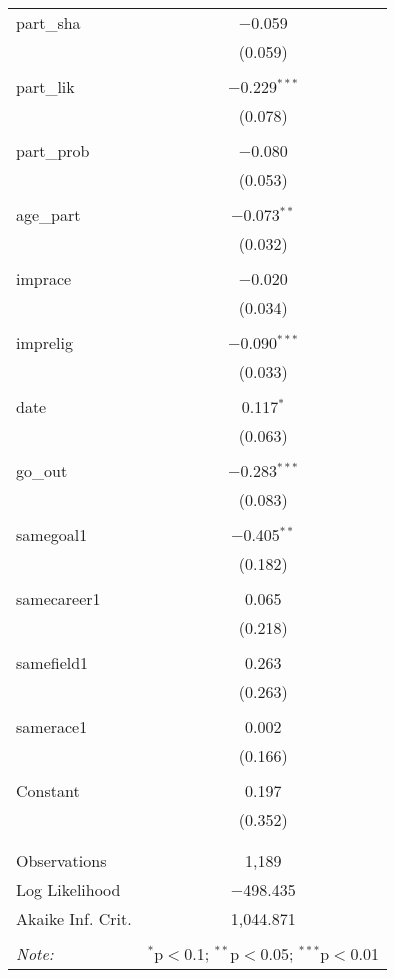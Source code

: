 \begin{table}[!htbp]
\begin{tabular}{@{\extracolsep{5pt}}lc}
 part\_sha & $-$0.059 \\ 
  & (0.059) \\ 
  & \\ 
 part\_lik & $-$0.229$^{***}$ \\ 
  & (0.078) \\ 
  & \\ 
 part\_prob & $-$0.080 \\ 
  & (0.053) \\ 
  & \\ 
 age\_part & $-$0.073$^{**}$ \\ 
  & (0.032) \\ 
  & \\ 
 imprace & $-$0.020 \\ 
  & (0.034) \\ 
  & \\ 
 imprelig & $-$0.090$^{***}$ \\ 
  & (0.033) \\ 
  & \\ 
 date & 0.117$^{*}$ \\ 
  & (0.063) \\ 
  & \\ 
 go\_out & $-$0.283$^{***}$ \\ 
  & (0.083) \\ 
  & \\ 
 samegoal1 & $-$0.405$^{**}$ \\ 
  & (0.182) \\ 
  & \\ 
 samecareer1 & 0.065 \\ 
  & (0.218) \\ 
  & \\ 
 samefield1 & 0.263 \\ 
  & (0.263) \\ 
  & \\ 
 samerace1 & 0.002 \\ 
  & (0.166) \\ 
  & \\ 
 Constant & 0.197 \\ 
  & (0.352) \\ 
  & \\ 
\hline \\[-1.8ex] 
Observations & 1,189 \\ 
Log Likelihood & $-$498.435 \\ 
Akaike Inf. Crit. & 1,044.871 \\ 
\hline 
\hline \\[-1.8ex] 
\textit{Note:}  & \multicolumn{1}{r}{$^{*}$p$<$0.1; $^{**}$p$<$0.05; $^{***}$p$<$0.01} \\ 
\end{tabular} 
\end{table} 
